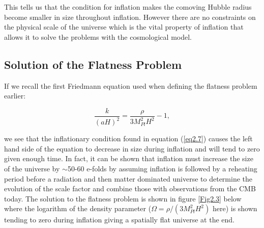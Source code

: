 \documentclass[a4paper,12pt,twoside]{report}
\begin{document}
This tells us that the condition for inflation makes the comoving Hubble radius become smaller in size throughout inflation. However there are no constraints on the physical scale of the universe which is the vital property of inflation that allows it to solve the problems with the cosmological model. 

\subsection{Solution of the Flatness Problem} \label{subsec:FlatSol}

If we recall the first Friedmann equation used when defining the flatness problem earlier:

\begin{equation}
\frac{k}{(aH)^{2}} = \frac{\rho}{3M_{Pl}^{2}H^{2}} - 1, \label{eq2.8}
\end{equation}

we see that the inflationary condition found in equation (\ref{eq2.7}) causes the left hand side of the equation to decrease in size during inflation and will tend to zero given enough time. In fact, it can be shown \cite{lyth2009primordial} that inflation must increase the size of the universe by $\sim$50-60 e-folds by assuming inflation is followed by a reheating period before a radiation and then matter dominated universe to determine the evolution of the scale factor and combine those with observations from the CMB today. The solution to the flatness problem is shown in figure \ref{Fig2.3} below where the logarithm of the density parameter ($\Omega = \rho/(3M_{Pl}^{2}H^{2})$ here) is shown tending to zero during inflation giving a spatially flat universe at the end.
\end{document}
